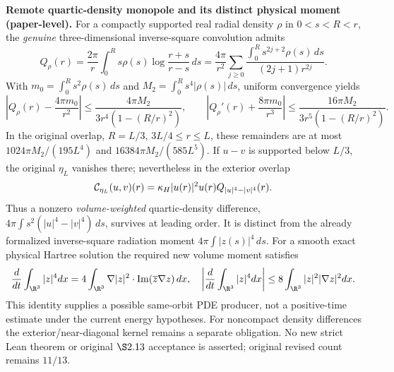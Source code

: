 
\medskip
\noindent\textbf{Remote quartic-density monopole and its distinct physical moment (paper-level).}
For a compactly supported real radial density \(\rho\) in \(0<s<R<r\),
the \emph{genuine} three-dimensional inverse-square convolution admits
\[
 Q_\rho(r)=\frac{2\pi}{r}\int_0^R s\rho(s)
       \log\frac{r+s}{r-s}\,ds
 =\frac{4\pi}{r^2}\sum_{j\ge0}
  \frac{\int_0^R s^{2j+2}\rho(s)\,ds}
       {(2j+1)r^{2j}}.
\]
With \(m_0=\int_0^R s^2\rho(s)\,ds\) and
\(M_2=\int_0^R s^4|\rho(s)|\,ds\), uniform convergence yields
\[
 \left|Q_\rho(r)-\frac{4\pi m_0}{r^2}\right|
 \le\frac{4\pi M_2}{3r^4(1-(R/r)^2)},\qquad
 \left|Q_\rho'(r)+\frac{8\pi m_0}{r^3}\right|
 \le\frac{16\pi M_2}{3r^5(1-(R/r)^2)}.
\]
In the original overlap, \(R=L/3\), \(3L/4\le r\le L\),
these remainders are at most
\(1024\pi M_2/(195 L^4)\) and \(16384\pi M_2/(585L^5)\).
If \(u-v\) is supported below \(L/3\), the original
\(\eta_L\) vanishes there; nevertheless in the exterior overlap
\[
 {\cal C}_{\eta_L}(u,v)(r)
 =\kappa_H|u(r)|^2u(r)Q_{|u|^4-|v|^4}(r).
\]
Thus a nonzero \emph{volume-weighted} quartic-density difference,
\(4\pi\int s^2(|u|^4-|v|^4)\,ds\), survives at leading order.
It is distinct from the already formalized inverse-square radiation
moment \(4\pi\int|z(s)|^4\,ds\).
For a smooth exact physical Hartree solution the required new
volume moment satisfies
\[
 \frac{d}{dt}\int_{\R^3}|z|^4dx
 =4\int_{\R^3}\nabla|z|^2\cdot
     \operatorname{Im}(\overline z\nabla z)\,dx,
 \quad
 \left|\frac{d}{dt}\int_{\R^3}|z|^4dx\right|
 \le8\int_{\R^3}|z|^2|\nabla z|^2dx.
\]
This identity supplies a possible same-orbit PDE producer, not a
positive-time estimate under the current energy hypotheses.
For noncompact density differences the exterior/near-diagonal kernel
remains a separate obligation.
No new strict Lean theorem or original \(\S2.13\) acceptance is
asserted; original revised count remains \(11/13\).
